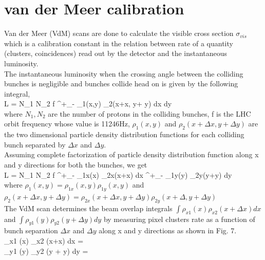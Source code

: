 \section{van der Meer calibration}
\label{sec:vdm}
Van der Meer (VdM) scans are done to calculate the visible cross section $\sigma_{vis}$ which is a calibration constant in the relation between rate of a quantity (clusters, coincidences) read out by the detector and the instantaneous luminosity. \\

The instantaneous luminosity when the crossing angle between the colliding bunches is negligible and bunches collide head on is given by the following integral, \\

L = N_1 N_2 f \int^{+\infty}_{-\infty} \rho_1(x,y) \rho_2(x+\Delta x, y+ \Delta y) dx dy \\

where $N_1, N_2$ are the number of protons in the colliding bunches, f is the LHC orbit frequency whose value is 11246Hz,  $\rho_1(x,y)$ and $\rho_2(x+\Delta x,y+\Delta y)$ are the two dimensional particle density distribution functions for each colliding bunch separated by $\Delta x$ and $\Delta y$. \\

Assuming complete factorization of particle density distribution function along x and y directions for both the bunches, we get \\

L = N_1 N_2 f \int^{+\infty}_{-\infty} \rho_{1x}(x) \rho_{2x}(x+\Delta x)  dx   \int^{+\infty}_{-\infty} \rho_{1y}(y) \rho_{2y}(y+\Delta y)  dy \\

where $\rho_1(x,y) = \rho_{1x}(x,y) \rho_{1y} (x,y)$ and $\rho_2(x+\Delta x,y + \Delta y) = \rho_{2x}(x+\Delta x,y+\Delta y) \rho_{2y} (x+\Delta,y+\Delta y)$ \\

The VdM scan determines the beam overlap integrals $\int \rho_{x1} (x) \rho_{x2} (x+\Delta x) dx$ and  $\int \rho_{y1}(y) \rho_{y2} (y+\Delta y) dy$ by measuring pixel clusters rate as a function of bunch separation $\Delta x$ and $\Delta y$ along x and y directions as shown in Fig. 7. \\

\int \rho_{x1} (x) \rho_{x2} (x+\Delta x) dx =  \\

\int \rho_{y1} (y) \rho_{y2} (y + \Delta y) dy =  \\

